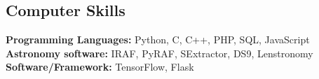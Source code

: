 \documentclass[margin, line]{res}
\newenvironment{list2}{
  \begin{list}{$\bullet$}{%
      \setlength{\itemsep}{0in}
      \setlength{\parsep}{0in} \setlength{\parskip}{0in}
      \setlength{\topsep}{0in} \setlength{\partopsep}{0in} 
      \setlength{\leftmargin}{0.2in}}}{\end{list}}
\begin{document}
\begin{resume}
\section{\sc Computer Skills} 
\textbf{Programming Languages:} Python, C, C++, PHP, SQL, JavaScript \\
\textbf{Astronomy software:} IRAF, PyRAF, SExtractor, DS9, Lenstronomy \\
\textbf{Software/Framework:} TensorFlow, Flask




\end{resume}
\end{document}
